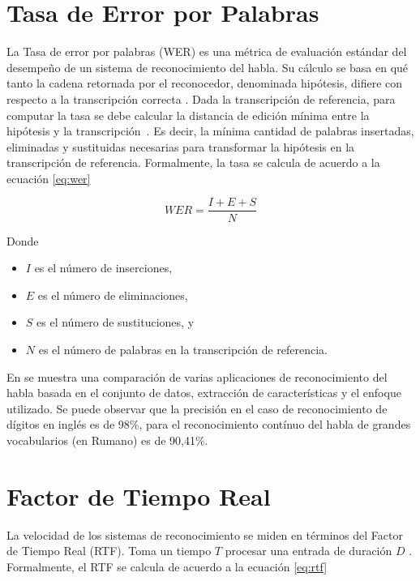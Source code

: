 \section{Tasa de Error por Palabras}
\label{sec:wer}

La Tasa de error por palabras (WER) es una m\'etrica de evaluaci\'on est\'andar del desempe\~no de un sistema de
reconocimiento del habla. Su c\'alculo se basa en qu\'e tanto la cadena retornada por el reconocedor,
denominada hip\'otesis, difiere con respecto a la transcripci\'on correcta \cite{Jurafsky}. 
Dada la transcripci\'on de referencia, para computar la tasa se debe calcular la distancia de edici\'on m\'inima
entre la hip\'otesis y la \mbox{transcripci\'on \cite{GaikwadAReview2010}}. Es decir, la m\'inima cantidad 
de palabras insertadas, eliminadas y sustituidas necesarias para transformar la hipótesis en la 
transcripción de referencia. Formalmente, la tasa se calcula de acuerdo a la ecuaci\'on \eqref{eq:wer}

\begin{equation}
\label{eq:wer}
    WER = \frac{I + E + S}{N} 
\end{equation}

Donde

\begin{itemize}
    \item $I$ es el n\'umero de inserciones,
    \item $E$ es el n\'umero de eliminaciones,
    \item $S$ es el n\'umero de sustituciones, y
    \item $N$ es el n\'umero de palabras en la transcripci\'on de referencia.
\end{itemize}

En \cite{VimalaReview2012} se muestra una comparaci\'on de varias aplicaciones de reconocimiento del habla basada
en el conjunto de datos, extracci\'on de caracter\'isticas y el enfoque utilizado. Se puede observar que la precisi\'on
en el caso de reconocimiento de d\'igitos en ingl\'es es de 98\%, para el reconocimiento cont\'inuo del habla
de grandes vocabularios (en Rumano) es de 90,41\%.

\section{Factor de Tiempo Real}
\label{sec:rtf}

La velocidad de los sistemas de reconocimiento se miden en t\'erminos del Factor de Tiempo Real (RTF). 
Toma un tiempo $T$ procesar una entrada de duraci\'on $D$ \cite{VimalaReview2012}. 
Formalmente, el RTF se calcula de acuerdo a la ecuaci\'on \eqref{eq:rtf}

